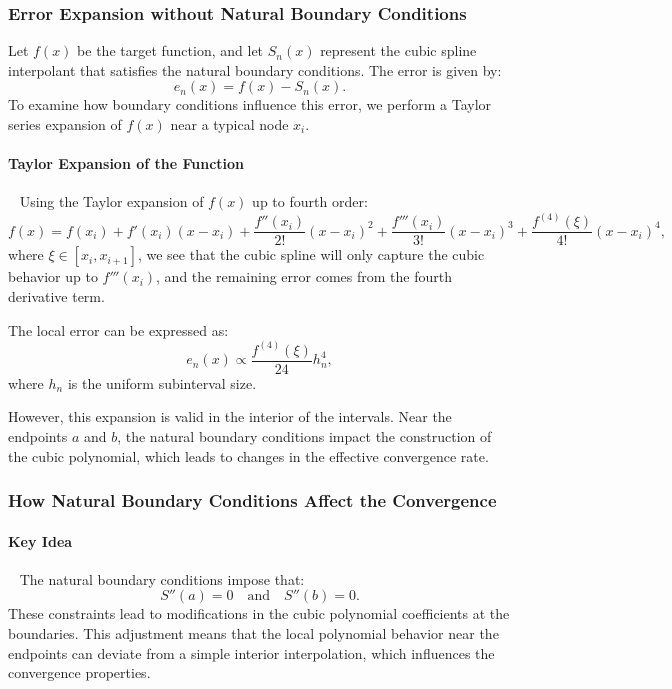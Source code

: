 \documentclass{article}
\begin{document}
\subsubsection{Error Expansion without Natural Boundary Conditions}
Let $f(x)$ be the target function, and let $S_n(x)$ represent the cubic spline interpolant that satisfies the natural boundary conditions. The error is given by:
\[
e_n(x) = f(x) - S_n(x).
\]
To examine how boundary conditions influence this error, we perform a Taylor series expansion of \( f(x) \) near a typical node \( x_i \).

\paragraph{\textbf{Taylor Expansion of the Function}}~{}\newline
Using the Taylor expansion of \( f(x) \) up to fourth order:
\[
f(x) = f(x_i) + f'(x_i)(x - x_i) + \frac{f''(x_i)}{2!}(x - x_i)^2 + \frac{f'''(x_i)}{3!}(x - x_i)^3 + \frac{f^{(4)}(\xi)}{4!}(x - x_i)^4,
\]
where \( \xi \in [x_i, x_{i+1}] \), we see that the cubic spline will only capture the cubic behavior up to \( f'''(x_i) \), and the remaining error comes from the fourth derivative term.

The local error can be expressed as:
\[
e_n(x) \propto \frac{f^{(4)}(\xi)}{24} h_n^4,
\]
where \( h_n \) is the uniform subinterval size.

However, this expansion is valid in the interior of the intervals. Near the endpoints \( a \) and \( b \), the natural boundary conditions impact the construction of the cubic polynomial, which leads to changes in the effective convergence rate.

\subsubsection{How Natural Boundary Conditions Affect the Convergence}
\paragraph{\textbf{Key Idea}}~{}\newline
The natural boundary conditions impose that:
\[
S''(a) = 0 \quad \text{and} \quad S''(b) = 0.
\]
These constraints lead to modifications in the cubic polynomial coefficients at the boundaries. This adjustment means that the local polynomial behavior near the endpoints can deviate from a simple interior interpolation, which influences the convergence properties.
\end{document}
